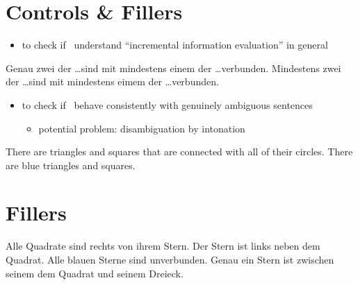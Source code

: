 \documentclass[fleqn,reqno,10pt]{article}
\begin{document}
\section{Controls \& Fillers}

\begin{itemize}
\item to check if \ understand ``incremental information
  evaluation'' in general
\end{itemize}

\medskip

\begin{exe}
  \ex Genau zwei der \dots sind mit mindestens einem der \dots verbunden.
  \ex Mindestens zwei der \dots sind mit mindestens eimem der \dots verbunden.
\end{exe}

\begin{itemize}
\item to check if \ behave consistently with genuinely
  ambiguous sentences
  \begin{itemize}
  \item potential problem: disambiguation by intonation
  \end{itemize}
\end{itemize}

\medskip

\begin{exe}
  \ex There are triangles and squares that are connected with all of
    their circles.
  \ex There are blue triangles and squares.
\end{exe}


\section{Fillers}

\begin{exe}
  \ex Alle Quadrate sind rechts von ihrem Stern.
  \ex Der Stern ist links neben dem Quadrat.
  \ex Alle blauen Sterne sind unverbunden.
  \ex Genau ein Stern ist zwischen seinem dem Quadrat und seinem
    Dreieck. 
\end{exe}



\end{document}
